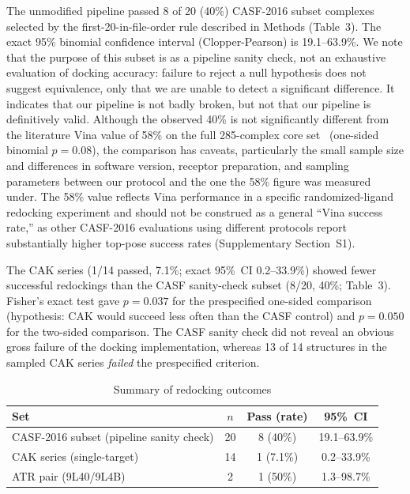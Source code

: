 \documentclass[global,twocolumn]{svjour}
\newcommand{\st}{\footnotesize\setlength{\tabcolsep}{3pt}}
\begin{document}
The unmodified pipeline passed 8 of 20 (40\%) CASF-2016 subset complexes
selected by the first-20-in-file-order rule described in Methods (Table~3).
The exact 95\% binomial confidence interval (Clopper-Pearson) is
19.1--63.9\%. We note that the purpose of this subset is as a pipeline
sanity check, not an exhaustive evaluation of docking accuracy: failure to
reject a null hypothesis does not suggest equivalence, only that we are
unable to detect a significant difference. It indicates that our pipeline
is not badly broken, but not that our pipeline is definitively valid.
Although the observed 40\% is not significantly different from the
literature Vina value of 58\% on the full 285-complex core
set~\cite{zhang2023} (one-sided binomial $p=0.08$), the comparison has
caveats, particularly the small sample size and differences in software
version, receptor preparation, and sampling parameters between our
protocol and the one the 58\% figure was measured under. The 58\% value
reflects Vina performance in a specific randomized-ligand redocking
experiment and should not be construed as a general ``Vina success rate,''
as other CASF-2016 evaluations using different protocols report
substantially higher top-pose success rates (Supplementary Section~S1).

The CAK series (1/14 passed, 7.1\%; exact 95\%~CI 0.2--33.9\%) showed fewer
successful redockings than the CASF sanity-check subset (8/20, 40\%;
Table~3). Fisher's exact test gave $p=0.037$ for the prespecified one-sided
comparison (hypothesis: CAK would succeed less often than the CASF
control) and $p=0.050$ for the two-sided comparison. The CASF sanity check
did not reveal an obvious gross failure of the docking implementation,
whereas 13 of 14 structures in the sampled CAK series \emph{failed} the
prespecified criterion.

\begin{table}[t]
\centering
\caption{Summary of redocking outcomes}
\label{tab:casf}
\st
\begin{tabular}{lccc}
\toprule
Set & $n$ & Pass (rate) & 95\%~CI \\
\midrule
CASF-2016 subset (pipeline sanity check) & 20 & 8 (40\%)   & 19.1--63.9\% \\
CAK series (single-target)             & 14 & 1 (7.1\%)  & 0.2--33.9\% \\
ATR pair (9L40/9L4B)                   & 2  & 1 (50\%)   & 1.3--98.7\% \\
\bottomrule
\end{tabular}
\end{table}
\FloatBarrier
\end{document}
